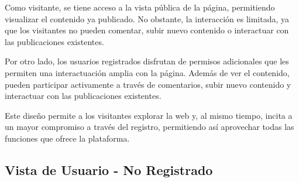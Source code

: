 \documentclass[a4paper, 12pt]{book}
\begin{document}
Como visitante, se tiene acceso a la vista pública de la página, permitiendo visualizar el contenido ya publicado. No obstante, la interacción 
es limitada, ya que los visitantes no pueden comentar, subir nuevo contenido o interactuar con las publicaciones existentes.

Por otro lado, los usuarios registrados disfrutan de permisos adicionales que les permiten una interactuación amplia con la página. Además de ver el 
contenido, pueden participar activamente a través de comentarios, subir nuevo contenido y interactuar con las publicaciones existentes.

Este diseño permite a los visitantes explorar la web y, al mismo tiempo, incita a un mayor compromiso a través del registro, permitiendo así aprovechar 
todas las funciones que ofrece la plataforma.

\subsection{Vista de Usuario - No Registrado}
\label{sec:vista_usuarios_no_registrado}
\end{document}
